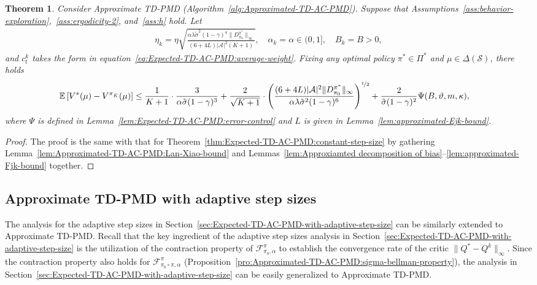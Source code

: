 \documentclass[10pt]{article}
\newcommand{\calA}{\mathcal{A}}
\newcommand{\calS}{\mathcal{S}}
\newcommand{\calF}{\mathcal{F}}
\newcommand{\E}{\mathbb{E}}
\newcommand{\ls}{\left}
\newcommand{\rs}{\right}
\theoremstyle{plain}
\newtheorem{theorem}{Theorem}[section]
\theoremstyle{definition}
\begin{document}
\begin{theorem}
    Consider Approximate TD-PMD \textup{(}Algorithm~\ref{alg:Approximated-TD-AC-PMD}\textup{)}. Suppose that Assumptions~\ref{ass:behavior-exploration},~\ref{ass:ergodicity-2}, and~\ref{ass:h} hold. Let
    \begin{align*}
        \eta_k = \eta \sqrt{\frac{\alpha\lambda \tilde\sigma^2 (1-\gamma)^4 \| D^{\pi^*}_{\pi_0} \|_\infty}{(6+4L)|\calA|^2(K+1)}}, \quad \alpha_k = \alpha \in (0,1], \quad B_k = B > 0,
    \end{align*}
    and $c_t^k$ takes the form in equation~\eqref{eq:Expected-TD-AC-PMD:average-weight}. Fixing any optimal policy $\pi^* \in \Pi^*$ and $\mu \in \Delta(\calS)$, there holds
    \begin{align*}
        \E\ls[ V^*(\mu) - V^{\pi_{\hat K}}(\mu) \rs] &\leq \frac{1}{K+1} \cdot \frac{3}{\alpha\tilde\sigma (1-\gamma)^3} + \frac{2}{\sqrt{K+1}} \cdot \ls( \frac{(6+4L)|\calA|^2 \| D^{\pi^*}_{\pi_0} \|_\infty}{\alpha\lambda \tilde\sigma^2(1-\gamma)^6} \rs)^{\nicefrac{1}{2}} + \frac{2}{\tilde\sigma(1-\gamma)^2} \Psi(B, \vartheta, m, \kappa),
    \end{align*}
    where $\Psi$ is defined in Lemma~\ref{lem:Expected-TD-AC-PMD:error-control} and $L$ is given in Lemma~\ref{lem:approximated-Ejk-bound}.
    \label{thm:Approximated-TD-AC-PMD:constant-step-size}
\end{theorem}

\begin{proof}
    The proof is the same with  that for  Theorem~\ref{thm:Expected-TD-AC-PMD:constant-step-size} by gathering Lemma~\ref{lem:Approximated-TD-AC-PMD:Lan-Xiao-bound} and Lemmas~\ref{lem:Approxiamted decomposition of bias}--\ref{lem:approximated-Fjk-bound} together.
\end{proof}


\subsection{Approximate TD-PMD with adaptive step sizes}
\label{sec:Approximated-TD-AC-PMD-with-adaptive-step-size}
The analysis for the adaptive step sizes in Section~\ref{sec:Expected-TD-AC-PMD-with-adaptive-step-size} can be similarly extended to Approximate TD-PMD. Recall that the key ingredient of the adaptive step sizes analysis in Section~\ref{sec:Expected-TD-AC-PMD-with-adaptive-step-size} is the utilization of the contraction property of $\calF^{\pi}_{\pi_b, \alpha}$ to establish the convergence rate of the critic $\| Q^* - Q^k \|_\infty$. Since the contraction property also holds for $\calF^{\pi}_{\pi_b\circ\pi, \alpha}$ (Proposition~\ref{pro:Approximated-TD-AC-PMD:sigma-bellman-property}), the analysis in Section~\ref{sec:Expected-TD-AC-PMD-with-adaptive-step-size} can be easily generalized to Approximate TD-PMD.
\end{document}
